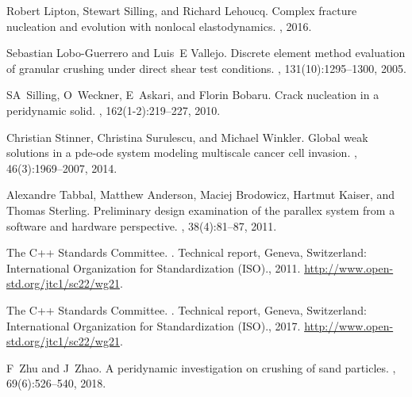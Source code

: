 \documentclass[11pt,twocolumn]{amsart}
\theoremstyle{definition}
\theoremstyle{definition}
\numberwithin{equation}{section}
\numberwithin{equation}{section}
\begin{document}
\begin{thebibliography}{10}
	Robert Lipton, Stewart Silling, and Richard Lehoucq.
	\newblock Complex fracture nucleation and evolution with nonlocal
	elastodynamics.
	, 2016.
	
	Sebastian Lobo-Guerrero and Luis~E Vallejo.
	\newblock Discrete element method evaluation of granular crushing under direct
	shear test conditions.
	,
	131(10):1295--1300, 2005.
	
	SA~Silling, O~Weckner, E~Askari, and Florin Bobaru.
	\newblock Crack nucleation in a peridynamic solid.
	, 162(1-2):219--227, 2010.
	
	Christian Stinner, Christina Surulescu, and Michael Winkler.
	\newblock Global weak solutions in a pde-ode system modeling multiscale cancer
	cell invasion.
	, 46(3):1969--2007, 2014.
	
	Alexandre Tabbal, Matthew Anderson, Maciej Brodowicz, Hartmut Kaiser, and
	Thomas Sterling.
	\newblock Preliminary design examination of the parallex system from a software
	and hardware perspective.
	, 38(4):81--87,
	2011.
	
	{The C++ Standards Committee}.
	.
	\newblock Technical report, {Geneva, Switzerland: International Organization
		for Standardization (ISO).}, 2011.
	\newblock \url{http://www.open-std.org/jtc1/sc22/wg21}.
	
	{The C++ Standards Committee}.
	.
	\newblock Technical report, {Geneva, Switzerland: International Organization
		for Standardization (ISO).}, 2017.
	\newblock \url{http://www.open-std.org/jtc1/sc22/wg21}.
	
	F~Zhu and J~Zhao.
	\newblock A peridynamic investigation on crushing of sand particles.
	, 69(6):526--540, 2018.
	
\end{thebibliography}
\end{document}
